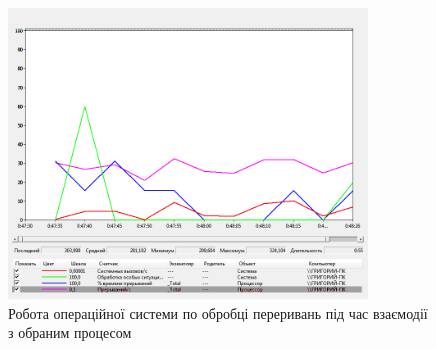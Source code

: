\documentclass[12pt,a4paper]{article}
\begin{document}
\begin{figure} \centering
    \includegraphics[width=0.8485\textwidth]{"interrupts/2.png"}
  \caption{Робота операційної системи по обробці переривань під час взаємодії з обраним процесом}
\end{figure}
\end{document}
